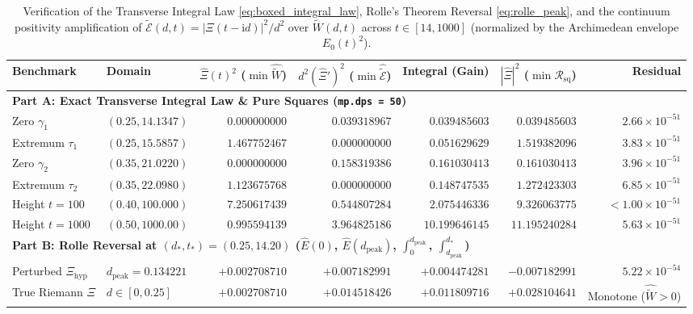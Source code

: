 \documentclass[11pt,a4paper,reqno]{amsart}
\theoremstyle{definition}
\theoremstyle{remark}
\numberwithin{equation}{section}
\newcommand{\ii}{\mathrm{i}}
\newcommand{\Wtil}{\widetilde{W}}
\newcommand{\Etil}{\widetilde{\mathcal{E}}}
\begin{document}
\begin{table}[htbp]
\centering
\caption{Verification of the Transverse Integral Law \eqref{eq:boxed_integral_law}, Rolle's Theorem Reversal \eqref{eq:rolle_peak}, and the continuum positivity amplification of $\Etil(d,t) = |\Xi(t-\ii d)|^2/d^2$ over $\Wtil(d,t)$ across $t \in [14, 1000]$ (normalized by the Archimedean envelope $E_0(t)^2$).}\label{tab:integral_law_gpu}
\scriptsize
\setlength{\tabcolsep}{2.0pt}
\begin{tabular}{llrrrrr}
\toprule
\textbf{Benchmark} & \textbf{Domain} & \textbf{$\widehat{\Xi}(t)^2$ ($\min\widehat{\Wtil}$)} & \textbf{$d^2(\widehat{\Xi}')^2$ ($\min\widehat{\Etil}$)} & \textbf{Integral (Gain)} & \textbf{$|\widehat{\Xi}|^2$ ($\min\mathcal{R}_{\mathrm{sq}}$)} & \textbf{Residual} \\
\midrule
\multicolumn{7}{l}{\textbf{Part A: Exact Transverse Integral Law \& Pure Squares (\texttt{mp.dps = 50})}} \\
Zero $\gamma_1$      & $(0.25, 14.1347)$ & $0.000000000$ & $0.039318967$ & $0.039485603$  & $0.039485603$  & $2.66 \times 10^{-51}$ \\
Extremum $\tau_1$    & $(0.25, 15.5857)$ & $1.467752467$ & $0.000000000$ & $0.051629629$  & $1.519382096$  & $3.83 \times 10^{-51}$ \\
Zero $\gamma_2$      & $(0.35, 21.0220)$ & $0.000000000$ & $0.158319386$ & $0.161030413$  & $0.161030413$  & $3.96 \times 10^{-51}$ \\
Extremum $\tau_2$    & $(0.35, 22.0980)$ & $1.123675768$ & $0.000000000$ & $0.148747535$  & $1.272423303$  & $6.85 \times 10^{-51}$ \\
Height $t = 100$     & $(0.40, 100.000)$ & $7.250617439$ & $0.544807284$ & $2.075446336$  & $9.326063775$  & $< 1.00 \times 10^{-51}$ \\
Height $t = 1000$    & $(0.50, 1000.00)$ & $0.995594139$ & $3.964825186$ & $10.199646145$ & $11.195240284$ & $5.63 \times 10^{-51}$ \\
\midrule
\multicolumn{7}{l}{\textbf{Part B: Rolle Reversal at $(d_*, t_*) = (0.25, 14.20)$ ($\widehat{E}(0)$, $\widehat{E}(d_{\mathrm{peak}})$, $\int_0^{d_{\mathrm{peak}}}$, $\int_{d_{\mathrm{peak}}}^{d_*}$)}} \\
Perturbed $\Xi_{\mathrm{hyp}}$ & $d_{\mathrm{peak}} = 0.134221$ & $+0.002708710$ & $+0.007182991$ & $+0.004474281$ & $-0.007182991$ & $5.22 \times 10^{-54}$ \\
True Riemann $\Xi$   & $d \in [0, 0.25]$ & $+0.002708710$ & $+0.014518426$ & $+0.011809716$ & $+0.028104641$ & Monotone ($\widehat{\Wtil} > 0$) \\

\end{tabular}
\end{table}
\end{document}
